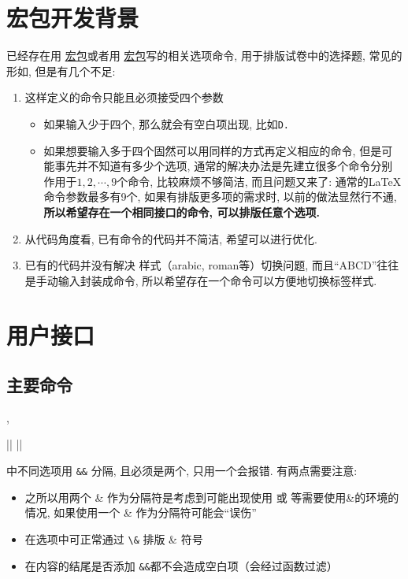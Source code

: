 \documentclass{l3doc}
\renewcommand{\emph}[1]{\begingroup \bfseries \textcolor{red!80}{#1} \endgroup}
\begin{document}
\begin{documentation}
\section{宏包开发背景}
已经存在用 \href{https://www.latexstudio.net/index/details/index/mid/2270.html}{宏包}或者用 \href{https://www.latexstudio.net/index/details/index/mid/2191.html}{宏包}写的相关选项命令, 用于排版试卷中的选择题, 常见的形如, 但是有几个不足:
\begin{enumerate}
  \item 这样定义的命令只能且必须接受四个参数
    \begin{itemize}
      \item 如果输入少于四个, 那么就会有空白项出现, 比如\verb*|D.  |
      \item 如果想要输入多于四个固然可以用同样的方式再定义相应的命令, 但是可能事先并不知道有多少个选项, 通常的解决办法是先建立很多个命令分别作用于$1, 2, \cdots, 9$个命令, 比较麻烦不够简洁, 而且问题又来了: 通常的LaTeX命令参数最多有9个, 如果有排版更多项的需求时, 以前的做法显然行不通, \emph{所以希望存在一个相同接口的命令, 可以排版任意个选项.}
    \end{itemize}
  \item 从代码角度看, 已有命令的代码并不简洁, 希望可以进行优化.
  \item 已有的代码并没有解决  样式（arabic, roman等）切换问题, 而且“ABCD”往往是手动输入封装成命令, 所以希望存在一个命令可以方便地切换标签样式.
\end{enumerate}



\section{用户接口}

\subsection{主要命令}

\begin{function}[added = 2021-12-18,updated = 2021-12-25]{\choices, \choices*}
  \begin{syntax}
    |\choices|  
    |\choices*|  
  \end{syntax}
   中不同选项用 \verb|&&| 分隔, 且必须是两个, 只用一个会报错. 有两点需要注意: 
    \begin{itemize}
      \item 之所以用两个 \& 作为分隔符是考虑到可能出现使用  或  等需要使用\&的环境的情况, 如果使用一个 \& 作为分隔符可能会“误伤”
      \item 在选项中可正常通过 \verb|\&| 排版 \& 符号
      \item 在内容的结尾是否添加 \verb|&&|都不会造成空白项（会经过函数过滤）
    \end{itemize}
\end{function}


\end{documentation}
\end{document}
